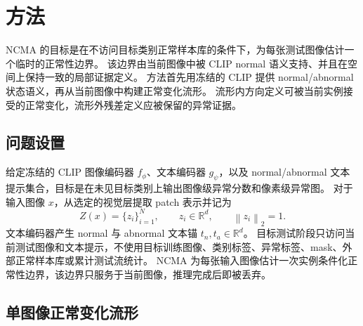 \documentclass[UTF8,11pt,a4paper,fontset=none]{ctexart}
\newcommand{\method}{NCMA}
\newcommand{\clip}{CLIP}
\newcommand{\R}{\mathbb{R}}
\newcommand{\norm}[1]{\left\lVert #1 \right\rVert}
\begin{document}
\section{方法}
\label{sec:method}

\method{} 的目标是在不访问目标类别正常样本库的条件下，为每张测试图像估计一个临时的正常性边界。
该边界由当前图像中被 CLIP normal 语义支持、并且在空间上保持一致的局部证据定义。
方法首先用冻结的 \clip{} 提供 normal/abnormal 状态语义，再从当前图像中构建正常变化流形。
流形内方向定义可被当前实例接受的正常变化，流形外残差定义应被保留的异常证据。

\subsection{问题设置}
\label{sec:setting}

给定冻结的 \clip{} 图像编码器 \(f_\phi\)、文本编码器 \(g_\psi\)，以及 normal/abnormal 文本提示集合，目标是在未见目标类别上输出图像级异常分数和像素级异常图。
对于输入图像 \(x\)，从选定的视觉层提取 patch 表示并记为
\begin{equation}
  Z(x)=\{z_i\}_{i=1}^{N}, \qquad z_i \in \R^d,\qquad \norm{z_i}_2=1 .
  \label{eq:patch_tokens}
\end{equation}
文本编码器产生 normal 与 abnormal 文本锚 \(t_n,t_a\in\R^d\)。
目标测试阶段只访问当前测试图像和文本提示，不使用目标训练图像、类别标签、异常标签、mask、外部正常样本库或累计测试流统计。
\method{} 为每张输入图像估计一次实例条件化正常性边界，该边界只服务于当前图像，推理完成后即被丢弃。

\subsection{单图像正常变化流形}
\label{sec:manifold}
\end{document}
